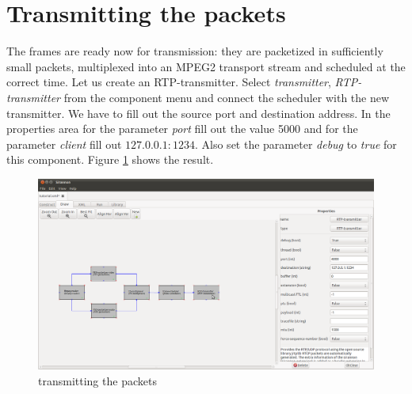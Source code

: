\documentclass[12pt]{report}
\begin{document}
\section{Transmitting the packets}
The frames are ready now for transmission: they are packetized in sufficiently small packets, multiplexed into an MPEG2 transport stream and scheduled at the correct time. Let us create an RTP-transmitter. Select \textit{transmitter}, \textit{RTP-transmitter} from the component menu and connect the scheduler with the new transmitter. We have to fill out the source port and destination address. In the properties area for the parameter \textit{port} fill out the value 5000 and for the parameter \textit{client} fill out $127.0.0.1:1234$. Also set the parameter \textit{debug} to \textit{true} for this component. Figure \ref{fig:13} shows the result. 
\begin{center}
\begin{figure}[!ht]
	\includegraphics[width=1.0\textwidth]{./images/ui08.png}
	\caption{transmitting the packets}
	\label{fig:13}
\end{figure}
\end{center}
\newpage
\end{document}
